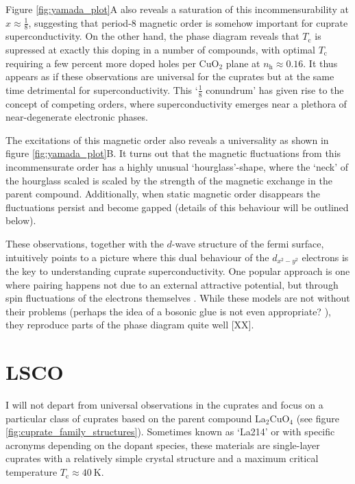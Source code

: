 Figure \ref{fig:yamada_plot}A also reveals a saturation of this incommensurability at $x \approx \frac{1}{8}$, suggesting that period-8 magnetic order is somehow important for cuprate superconductivity. On the other hand, the phase diagram reveals that $T_\text{c}$ is supressed at exactly this doping in a number of compounds, with optimal $T_\text{c}$ requiring a few percent more doped holes per CuO$_2$ plane at $n_\text{h} \approx 0.16$. It thus appears as if these observations are universal for the cuprates but at the same time detrimental for superconductivity. This `$\frac{1}{8}$ conundrum' has given rise to the concept of competing orders, where superconductivity emerges near a plethora of near-degenerate electronic phases.

The excitations of this magnetic order also reveals a universality as shown in figure \ref{fig:yamada_plot}B. It turns out that the magnetic fluctuations from this incommensurate order has a highly unusual `hourglass'-shape, where the `neck' of the hourglass scaled is scaled by the strength of the magnetic exchange in the parent compound. Additionally, when static magnetic order disappears the fluctuations persist and become gapped (details of this behaviour will be outlined below).

These observations, together with the $d$-wave structure of the fermi surface, intuitively points to a picture where this dual behaviour of the $d_{x^2-y^2}$ electrons is the key to understanding cuprate superconductivity. One popular approach is one where pairing happens not due to an external attractive potential, but through spin fluctuations of the electrons themselves \cite{Scalapino2012}. While these models are not without their problems (perhaps the idea of a bosonic glue is not even appropriate? \cite{Anderson2007}), they reproduce parts of the phase diagram quite well [XX].

\section{LSCO}\label{sec:lsco}
I will not depart from universal observations in the cuprates and focus on a particular class of cuprates based on the parent compound La$_2$CuO$_4$ (see figure \ref{fig:cuprate_family_structures}). Sometimes known as `La214' or with specific acronyms depending on the dopant species, these materials are single-layer cuprates with a relatively simple crystal structure and a maximum critical temperature $T_\text{c} \approx \SI{40}{\kelvin}$.

